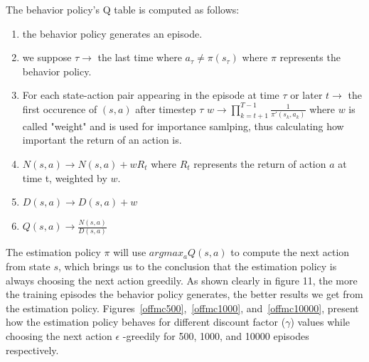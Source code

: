 \documentclass[a4paper,11pt]{article}
\begin{document}
The behavior policy's Q table is computed as follows: 
\begin{enumerate}
\item the behavior policy generates an episode.

\item we suppose $\tau \rightarrow$ the last time where $a_\tau \neq \pi(s_\tau)$ where $\pi$ represents the behavior policy.

\item For each state-action pair appearing in the episode at time $\tau$ or later $t \rightarrow$ the first occurence of $(s,a)$ after timestep $\tau$
$w \rightarrow \prod^{T-1}_{k=t+1}\frac{1}{\pi '(s_k,a_k)}$ where $w$ is called "weight" and is used for importance samlping, thus calculating how important the return of an action is.

\item $N(s,a) \rightarrow N(s,a) + wR_t$  where $R_t$ represents the return of action $a$ at time t, weighted by $w$.

\item $D(s,a) \rightarrow D(s,a) + w$

\item $Q(s,a) \rightarrow \frac{N(s,a)}{D(s,a)}$
\end{enumerate}
The estimation policy $\pi$ will use $argmax_aQ(s,a)$ to compute the next action from state $s$, which brings us to the conclusion that the estimation policy is always choosing the next action greedily. As shown clearly in figure 11, the more the training episodes the behavior policy generates, the better results we get from the estimation policy. Figures~\ref{offmc500},~\ref{offmc1000}, and~\ref{offmc10000}, present how the estimation policy behaves for different discount factor ($\gamma$) values while choosing the next action $\epsilon$ -greedily for 500, 1000, and 10000 episodes respectively. 
\end{document}
